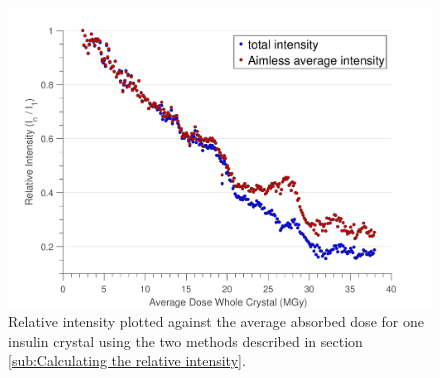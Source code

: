\begin{figure}
  \centering
    \includegraphics[width=1.0\textwidth]{figures/dwd/calcrelint.pdf}
    \caption[Relative intensity plotted against the average absorbed dose for one insulin crystal.]{Relative intensity plotted against the average absorbed dose for one insulin crystal using the two methods described in section \ref{sub:Calculating the relative intensity}.}
    \label{figrelint}
\end{figure}

